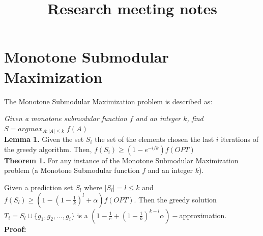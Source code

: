 \documentclass{article}
\title{Research meeting notes}
\begin{document}
\maketitle

\section{Monotone Submodular Maximization}

The Monotone Submodular Maximization problem is described as: 
\vspace{0.05in}

\indent \emph{Given a monotone submodular function $f$ and an integer $k$, find $S = argmax_{A: |A| \leq k}\; f(A)$} \\

\noindent \textbf{Lemma 1.} Given the set $S_i$ the set of the elements chosen the last $i$ iterations of the greedy algorithm. Then, $f(S_i) \geq (1-e^{-i/k})f(OPT)$ \\

\noindent \textbf{Theorem 1.} For any instance of the Monotone Submodular Maximization problem (a Monotone Submodular function $f$ and an integer $k$). 

Given a prediction set $S_l$ where $|S_l| = l \leq k$ and $f(S_l) \geq (1 - (1 - \frac{1}{k})^l + \alpha) f(OPT)$. Then the greedy solution $T_i = S_l \cup \{g_1, g_2, ..., g_i\}$ is a $(1 - \frac{1}{e} + (1 - \frac{1}{k})^{k-l}\alpha)-$approximation. \\

\textbf{Proof:}
\end{document}
